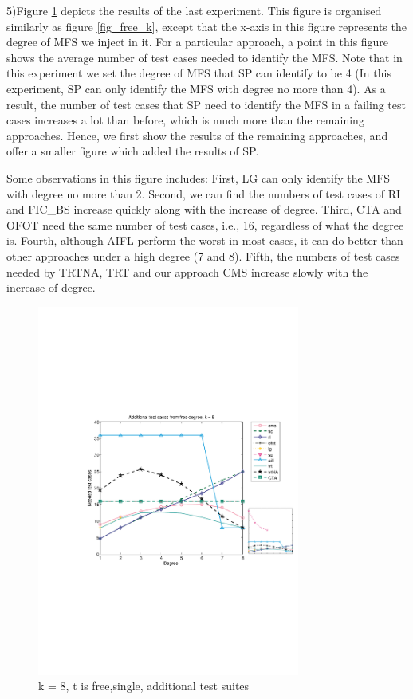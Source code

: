 \documentclass{sig-alternate-05-2015}
\begin{document}
{{{{5)Figure \ref{fig_free_d} depicts the results of the last experiment. This figure is organised similarly as figure \ref{fig_free_k}, except that the x-axis in this figure represents the degree of MFS we inject in it. For a particular approach, a point in this figure shows the average number of test cases needed to identify the MFS. Note that in this experiment we set the degree of MFS that SP can identify to be 4 (In this experiment, SP can only identify the MFS with degree no more than 4). As a result, the number of test cases that SP need to identify the MFS in a failing test cases increases a lot than before, which is much more than the remaining approaches. Hence, we first show the results of the remaining approaches, and offer a smaller figure which added the results of SP.


Some observations in this figure includes:  First, LG can only identify the MFS with degree no more than 2.  Second, we can find the numbers of test cases of RI and FIC\_BS increase quickly along with the increase of degree. Third, CTA and OFOT need the same number of test cases, i.e., 16, regardless of what the degree is. Fourth, although AIFL perform the worst in most cases, it can do better than other approaches under a high degree (7 and 8).  Fifth, the numbers of test cases needed by TRTNA, TRT and our approach CMS increase slowly with the increase of degree.

\begin{figure}
 \centering
 \includegraphics[width=3.4in]{cpp2.pdf}
 \caption{k = 8, t is free,single, additional test suites}
 \label{fig_free_d}
\end{figure}

}}}}
\end{document}
